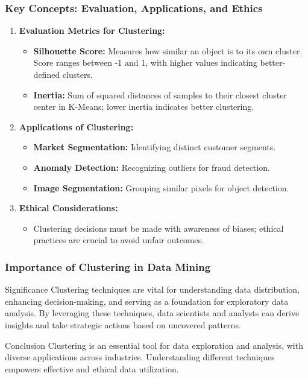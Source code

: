 \documentclass[aspectratio=169]{beamer}
\begin{document}
\begin{frame}[fragile]
    \frametitle{Key Concepts: Evaluation, Applications, and Ethics}
    \begin{enumerate}
        \item \textbf{Evaluation Metrics for Clustering:}
        \begin{itemize}
            \item \textbf{Silhouette Score:} Measures how similar an object is to its own cluster. Score ranges between -1 and 1, with higher values indicating better-defined clusters.
            \item \textbf{Inertia:} Sum of squared distances of samples to their closest cluster center in K-Means; lower inertia indicates better clustering.
        \end{itemize}

        \item \textbf{Applications of Clustering:}
        \begin{itemize}
            \item \textbf{Market Segmentation:} Identifying distinct customer segments.
            \item \textbf{Anomaly Detection:} Recognizing outliers for fraud detection.
            \item \textbf{Image Segmentation:} Grouping similar pixels for object detection.
        \end{itemize}
        
        \item \textbf{Ethical Considerations:}
        \begin{itemize}
            \item Clustering decisions must be made with awareness of biases; ethical practices are crucial to avoid unfair outcomes.
        \end{itemize}
    \end{enumerate}
\end{frame}

\begin{frame}[fragile]
    \frametitle{Importance of Clustering in Data Mining}
    \begin{block}{Significance}
        Clustering techniques are vital for understanding data distribution, enhancing decision-making, and serving as a foundation for exploratory data analysis. By leveraging these techniques, data scientists and analysts can derive insights and take strategic actions based on uncovered patterns.
    \end{block}
    
    \begin{block}{Conclusion}
        Clustering is an essential tool for data exploration and analysis, with diverse applications across industries. Understanding different techniques empowers effective and ethical data utilization.
    \end{block}
\end{frame}
\end{document}
